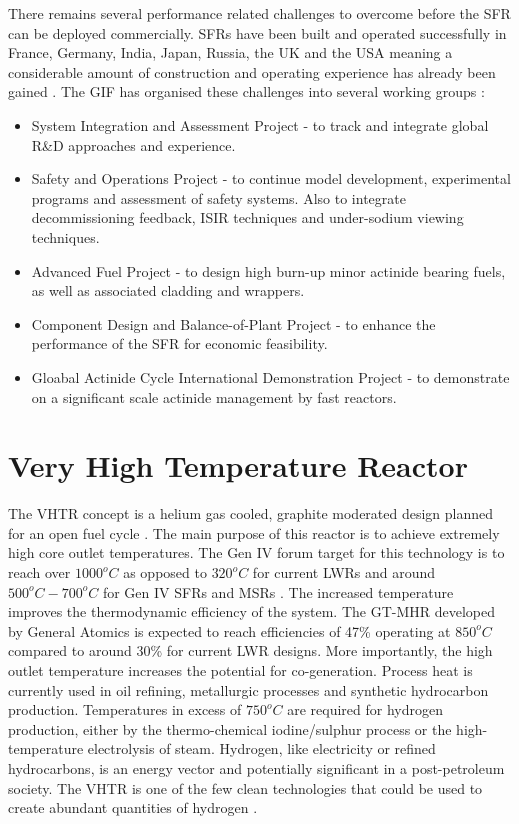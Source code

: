 \documentclass[journal]{IEEEtran}
\begin{document}
There remains several performance related challenges to overcome before the SFR can be deployed commercially. 
SFRs have been built and operated successfully in France, Germany, India, Japan, Russia, the UK and the USA meaning a considerable amount of construction and operating experience has already been gained \cite{Int2012}.
The GIF has organised these challenges into several working groups \cite{GenIVForum}:
\begin{itemize}
\item System Integration and Assessment Project - to track and integrate global R\&D approaches and experience.
\item Safety and Operations Project - to continue model development, experimental programs and assessment of safety systems. Also to integrate decommissioning feedback, ISIR techniques and under-sodium viewing techniques.
\item Advanced Fuel Project - to design high burn-up minor actinide bearing fuels, as well as associated cladding and wrappers.
\item Component Design and Balance-of-Plant Project - to enhance the performance of the SFR for economic feasibility. 
\item Gloabal Actinide Cycle International Demonstration Project - to demonstrate on a significant scale actinide management by fast reactors.
\end{itemize}


\section{Very High Temperature Reactor}
The VHTR concept is a helium gas cooled, graphite moderated design planned for an open fuel cycle \cite{Marques2010a}.
The main purpose of this reactor is to achieve extremely high core outlet temperatures. The Gen IV forum target for this technology is to reach over $1000^oC$ \cite{GenIVRoadmap} as opposed to $320^oC$ for current LWRs and around $500^oC-700^oC$ for Gen IV SFRs and MSRs \cite{Bhatnagar2011}.
The increased temperature improves the thermodynamic efficiency of the system.
The GT-MHR developed by General Atomics is expected to reach efficiencies of 47\% operating at $850^oC$ \cite{Marques2010a} compared to around 30\% for current LWR designs.
More importantly, the high outlet temperature increases the potential for co-generation.
Process heat is currently used in oil refining, metallurgic processes and synthetic hydrocarbon production.
Temperatures in excess of $750^oC$ are required for hydrogen production, either by the thermo-chemical iodine/sulphur process or the high-temperature electrolysis of steam.
Hydrogen, like electricity or refined hydrocarbons, is an energy vector and potentially significant in a post-petroleum society.
The VHTR is one of the few clean technologies that could be used to create abundant quantities of hydrogen \cite{Bhatnagar2011}.
\end{document}
